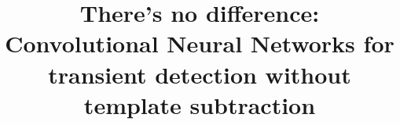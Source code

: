 \documentclass[linenumbers, twocolumn]{aastex631}
\begin{document}
\title{There's no difference: Convolutional Neural Networks for transient detection without template subtraction}


\end{document}
